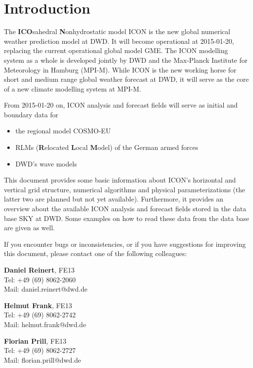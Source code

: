 \chapter{Introduction}

The \textbf{ICO}sahedral \textbf{N}onhydrostatic model ICON is the new global numerical 
weather prediction model at DWD. It will become operational at 2015-01-20, replacing the current 
operational global model GME. The ICON modelling system as a whole is developed jointly by DWD and the 
Max-Planck Institute for Meteorology in Hamburg (MPI-M). While ICON is the new working horse 
for short and medium range global weather forecast at DWD, it will serve as the core of a new climate 
modelling system at MPI-M.

From 2015-01-20 on, ICON analysis and forecast fields will serve as initial and boundary data for
\begin{itemize}
 \item the regional model COSMO-EU
 \item RLMs (\textbf{R}elocated \textbf{L}ocal \textbf{M}odel) of the German armed forces
 \item DWD's wave models
\end{itemize}

This document provides some basic information about ICON's horizontal and vertical grid structure, 
numerical algorithms and physical parameterizations (the latter two are planned but not yet available). 
Furthermore, it provides an overview about the available ICON analysis and forecast fields stored in the 
data base SKY at DWD. Some examples on how to read these data from the data base are given as well.

\newpage
If you encounter bugs or inconsistencies, or if you have suggestions for improving this document, 
please contact one of the following colleagues:

\begin{note}
\begin{minipage}{\textwidth}
\centering
\begin{minipage}{0.32\textwidth}
 \textbf{Daniel Reinert}, FE13 \\
 Tel: +49 (69) 8062-2060 \\ 
 Mail: daniel.reinert@dwd.de
\end{minipage}
\begin{minipage}{0.32\textwidth}
 \textbf{Helmut Frank}, FE13\\
 Tel: +49 (69) 8062-2742 \\ 
 Mail: helmut.frank@dwd.de
\end{minipage}
\begin{minipage}{0.32\textwidth}
 \textbf{Florian Prill}, FE13 \\
 Tel: +49 (69) 8062-2727 \\ 
 Mail: florian.prill@dwd.de
\end{minipage}
\end{minipage}
\end{note}  
